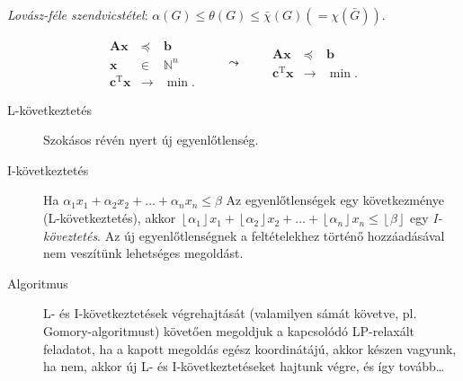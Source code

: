 \documentclass[DIV=15,appendixprefix]{scrreprt}
\theoremstyle{definition}
\theoremstyle{remark}
\DeclareMathOperator{\T}{T}
\begin{document}
\begin{description}
		\emph{Lovász-féle szendvicstétel}: $ \alpha \left( G \right) \le \theta \left( G \right) \le
		\bar{ \chi } \left( G \right) \left( = \chi \left( \bar{ G } \right) \right) $.
\end{description}
%
\begin{equation}\tag{IP és LP-relaxáltja}
	\begin{array}{rcl}
		\mathbf{ A } \mathbf{ x } 			&	\preceq		&	\mathbf{ b }\\
		\mathbf{ x } 						&	\in			&	\mathbb{ N }^{ n }\\
		\hline
		\mathbf{ c }^{ \T } \mathbf{ x }	&	\rightarrow	&	\min.
	\end{array} \qquad \leadsto \qquad \begin{array}{rcl}
		\mathbf{ A } \mathbf{ x } 			&	\preceq		&	\mathbf{ b }\\
		\hline
		\mathbf{ c }^{ \T } \mathbf{ x }	&	\rightarrow	&	\min.
	\end{array}
\end{equation}
\begin{description}
	\item[L-következtetés] Szokásos  révén nyert új egyenlőtlenség.
	\item[I-következtetés] Ha $ \alpha_{ 1 } x_{ 1 } + \alpha_{ 2 } x_{ 2 } + \ldots +
		\alpha_{ n } x_{ n } \le \beta $ Az egyenlőtlenségek egy következménye
		(L-következtetés), akkor $ \left\lfloor \alpha_{ 1 } \right\rfloor x_{ 1 } +
		\left\lfloor \alpha_{ 2 } \right\rfloor x_{ 2 } + \ldots + \left\lfloor \alpha_{ n }
		\right\rfloor x_{ n } \le \left\lfloor \beta \right\rfloor $ egy \emph{I-köveztetés}. Az
		új egyenlőtlenségnek a feltételekhez történő hozzáadásával nem veszítünk lehetséges
		megoldást.
	\item[Algoritmus] L- és I-következtetések végrehajtását (valamilyen sámát követve, pl.
		Gomory-al\-go\-rit\-must) követően megoldjuk a kapcsolódó LP-relaxált feladatot, ha a kapott
		megoldás egész koordinátájú, akkor készen vagyunk, ha nem, akkor új L- és
		I-következtetéseket hajtunk végre, és így tovább\ldots
\end{description}
\end{document}

